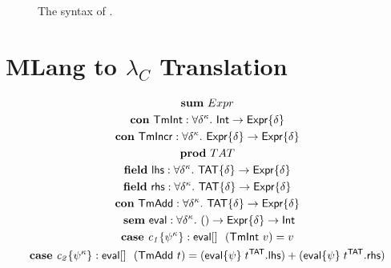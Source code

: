 \documentclass{article}
\begin{document}
\begin{figure}[t]
    \scriptsize
    
    \caption{The syntax of \mcorecalc.}
    \label{fig:mcore-syntax}
\end{figure}

\clearpage 
\section*{MLang to $\lambda_C$ Translation}




\newcommand{\Expr}[0]{\mathsf{Expr}}
\newcommand{\Int}[0]{\mathsf{Int}}
\newcommand{\TmInt}[0]{\mathsf{TmInt}}
\newcommand{\TmIncr}[0]{\mathsf{TmIncr}}
\newcommand{\TmAdd}[0]{\mathsf{TmAdd}}

\newcommand{\TmAddType}[0]{\mathsf{TAT}}
\newcommand{\lhs}[0]{\mathsf{lhs}}
\newcommand{\rhs}[0]{\mathsf{rhs}}

\newcommand{\eval}[0]{\mathsf{eval}}
\newcommand{\desugar}[0]{\mathsf{desugar}}



\begin{gather}
    \dsum \Expr \\
    \dcon{\TmInt}{\tmvar{\delta}}{\kappa}{\Int}{\Expr} \\
    \dcon{\TmIncr}{\tmvar{\delta}}{\kappa}{\tysyn{\Expr}{\tmvar{\delta}}}{\Expr} \\
    \dprod \TmAddType \\
    \dfield{\lhs}{\tmvar{\delta}}{\kappa}{\TmAddType}{\tysyn{\Expr}{\delta}} \\
    \dfield{\rhs}{\tmvar{\delta}}{\kappa}{\TmAddType}{\tysyn{\Expr}{\delta}} \\
    \dcon{\TmAdd}{\tmvar{\delta}}{\kappa}{\tysyn{\TmAddType}{\tmvar{\delta}}}{\Expr} \\
    ~
    \dsem{\eval}{\withki{\tmvar{\delta}}{\kappa}}{()}{\tysyn{\Expr}{\delta}}{\Int} \\
    \dcase{c_1}{\withki{\psi}{\kappa}}{\eval}{}{}{(\TmInt ~ v)}{v} \\
    \dcase{c_2}{\withki{\psi}{\kappa}}{\eval}{}{}{(\TmAdd ~ t)}{(\tmapp{\tysyn{\eval}{\psi}}{t^{\TmAddType}.\lhs}) + (\tmapp{\tysyn{\eval}{\psi}}{t^{\TmAddType}.\rhs})} \\
\end{gather}

%     
%     

%     
\end{document}
